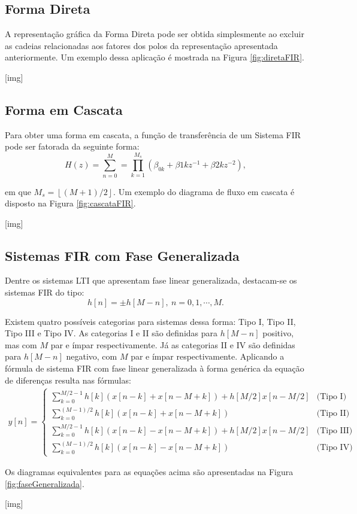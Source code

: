 \documentclass[11pt]{article}
\begin{document}
\subsection{Forma Direta}

A representação gráfica da Forma Direta pode ser obtida simplesmente ao excluir as cadeias relacionadas aos fatores dos polos da representação apresentada anteriormente. Um exemplo dessa aplicação é mostrada na Figura \ref{fig:diretaFIR}.

[img]

\subsection{Forma em Cascata}

Para obter uma forma em cascata, a função de transferência de um Sistema FIR pode ser fatorada da seguinte forma:
\begin{equation}
	H(z) = \sum_{n=0}^{M} = \prod_{k=1}^{M_s}\left( \beta_{0k} + \beta{1k} z^{-1} + \beta{2k} z^{-2} \right),
\end{equation}

\noindent em que $M_s = \left\lfloor (M+1) / 2 \right\rfloor$. Um exemplo do diagrama de fluxo em cascata é disposto na Figura \ref{fig:cascataFIR}.

[img]

\subsection{Sistemas FIR com Fase Generalizada} 

Dentre os sistemas LTI que apresentam fase linear generalizada, destacam-se os sistemas FIR do tipo:
\begin{equation}
	h[n] = \pm h[M - n],\ n = 0, 1, \cdots, M.
\end{equation}

Existem quatro possíveis categorias para sistemas dessa forma: Tipo I, Tipo II, Tipo III e Tipo IV. As categorias I e II são definidas para $h[M-n]$ positivo, mas com $M$ par e ímpar respectivamente. Já as categorias II e IV são definidas para $h[M-n]$ negativo, com $M$ par e ímpar respectivamente. Aplicando a fórmula de sistema FIR com fase linear generalizada à forma genérica da equação de diferenças resulta nas fórmulas:
\begin{align}
y[n] = \begin{cases}
	 \displaystyle\sum_{k=0}^{M/2-1} h[k](x[n-k]+x[n-M+k])+h[M/2]x[n-M/2] & \text{(Tipo I)} \\
	 \displaystyle\sum_{k=0}^{(M-1)/2} h[k](x[n-k]+x[n-M+k]) & \text{(Tipo II)} \\
	 \displaystyle\sum_{k=0}^{M/2-1} h[k](x[n-k]-x[n-M+k])+h[M/2]x[n-M/2] & \text{(Tipo III)} \\
	 \displaystyle\sum_{k=0}^{(M-1)/2} h[k](x[n-k]-x[n-M+k]) & \text{(Tipo IV)}
\end{cases}
\end{align}

Os diagramas equivalentes para as equações acima são apresentadas na Figura \ref{fig:faseGeneralizada}.

[img]

\end{document}
